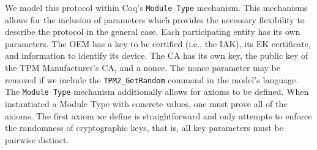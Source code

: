 We model this protocol within Coq's \verb|Module Type| mechanism. This mechanisms allows for the inclusion of parameters which provides the necessary flexibility to describe the protocol in the general case. Each participating entity has its own parameters. The OEM has a key to be certified (i.e., the IAK), its EK certificate, and information to identify its device. The CA has its own key, the public key of the TPM Manufacturer's CA, and a nonce. The nonce parameter may be removed if we include the \verb|TPM2_GetRandom| command in the model's language. The \verb|Module Type| mechanism additionally allows for axioms to be defined. When instantiated a Module Type with concrete values, one must prove all of the axioms. The first axiom we define is straightforward and only attempts to enforce the randomness of cryptographic keys, that is, all key parameters must be pairwise distinct.




